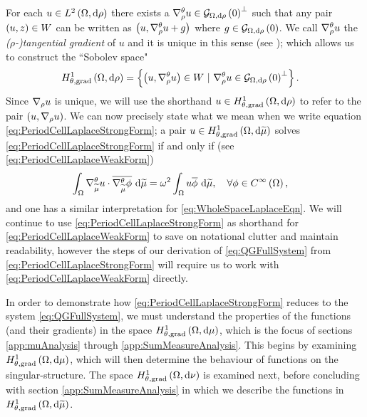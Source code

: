 For each $u\in L^{2}\left( \Omega,\mathrm{d}\rho \right)$ there exists a $\nabla^{\theta}_\rho u\in\mathcal{G}_{ \Omega, \mathrm{d}\rho}\left( 0 \right)^{\perp}$ such that any pair $\left( u,z \right)\in W$ can be written as $\left( u,\nabla^{\theta}_\rho u + g \right)$ where $g\in\mathcal{G}_{ \Omega, \mathrm{d}\rho}\left( 0 \right)$.
We call $\nabla^{\theta}_\rho u$ the \emph{($\rho$-)tangential gradient} of $u$ and it is unique in this sense (see \cite[Section~9]{zhikov2000extension}); which allows us to construct the ``Sobolev space"
\begin{align*}
	H^1_{\theta, \mathrm{grad}}\left( \Omega, \mathrm{d}\rho \right) &= \left\{  \left( u, \nabla^{\theta}_\rho u \right)\in W \ \vert \ \nabla^{\theta}_\rho u \in \mathcal{G}_{ \Omega, \mathrm{d}\rho}\left( 0 \right)^{\perp}  \right\}.
\end{align*}
Since $\nabla_\rho u$ is unique, we will use the shorthand $u\in H^1_{\theta, \mathrm{grad}}\left( \Omega, \mathrm{d}\rho \right)$ to refer to the pair $\left( u, \nabla_\rho u \right)$.
We can now precisely state what we mean when we write equation \eqref{eq:PeriodCellLaplaceStrongForm}; a pair $u\in H^1_{\theta, \mathrm{grad}}\left( \Omega, \mathrm{d}\widetilde{\mu} \right)$ solves \eqref{eq:PeriodCellLaplaceStrongForm} if and only if (see \eqref{eq:PeriodCellLaplaceWeakForm})
\begin{align*}
	\int_{\Omega}\nabla^{\theta}_{\widetilde{\mu}}u\cdot\overline{\nabla^{\theta}_{\widetilde{\mu}}\phi} \ \mathrm{d}\widetilde{\mu} &= \omega^2\int_{\Omega}u\overline{\phi} \ \mathrm{d}\widetilde{\mu}, \quad\forall \phi\in C^{\infty}\left( \Omega \right),
\end{align*}
and one has a similar interpretation for \eqref{eq:WholeSpaceLaplaceEqn}.
We will continue to use \eqref{eq:PeriodCellLaplaceStrongForm} as shorthand for \eqref{eq:PeriodCellLaplaceWeakForm} to save on notational clutter and maintain readability, however the steps of our derivation of \eqref{eq:QGFullSystem} from \eqref{eq:PeriodCellLaplaceStrongForm} will require us to work with \eqref{eq:PeriodCellLaplaceWeakForm} directly.

In order to demonstrate how \eqref{eq:PeriodCellLaplaceStrongForm} reduces to the system \eqref{eq:QGFullSystem}, we must understand the properties of the functions (and their gradients) in the space $H^1_{\theta, \mathrm{grad}}\left( \Omega, \mathrm{d}\mu \right)$, which is the focus of sections \ref{app:muAnalysis} through \ref{app:SumMeasureAnalysis}.
This begins by examining $H^1_{\theta, \mathrm{grad}}\left( \Omega, \mathrm{d}\mu \right)$, which will then determine the behaviour of functions on the singular-structure.
The space $H^1_{\theta, \mathrm{grad}}\left( \Omega, \mathrm{d}\nu \right)$ is examined next, before concluding with section \ref{app:SumMeasureAnalysis} in which we describe the functions in $H^1_{\theta, \mathrm{grad}}\left( \Omega, \mathrm{d}\widetilde{\mu} \right)$.